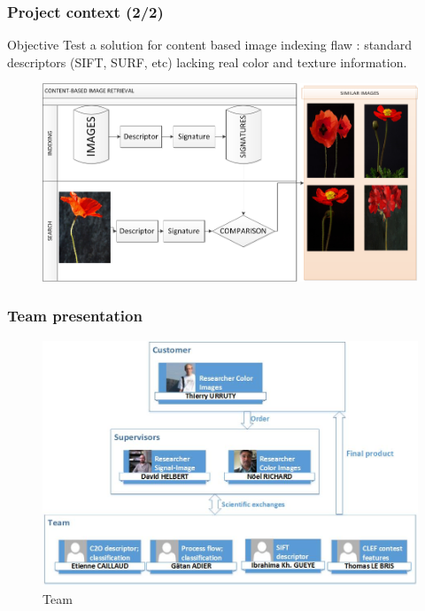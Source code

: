 \documentclass[xcolor=table]{beamer}
\begin{document}
\begin{frame} \frametitle{Project context (2/2)}
\begin{block}{Objective}
  Test a solution for content based image indexing flaw : standard descriptors (SIFT, SURF, etc) lacking real color and texture information.
\end{block}
	
\begin{figure}
	\includegraphics[scale=0.38]{CBIR.png}
\end{figure}

\end{frame}



\begin{frame} \frametitle{Team presentation}

\begin{figure}[h]
    \center
    \includegraphics[scale=0.45]{Dessin1.jpg}
    \caption{Team}\label{fig:team}
\end{figure}

\end{frame}
\end{document}
